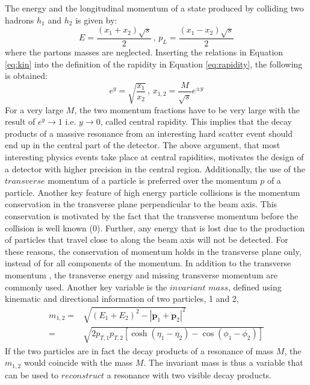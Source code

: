 The energy and the longitudinal momentum of a state produced by colliding two hadrons $h_{1}$ and $h_{2}$ is given by:
\begin{equation}
E=\frac{(x_{1}+x_{2})\sqrt{s}}{2}\, , \, p_{L}=\frac{(x_{1}-x_{2})\sqrt{s}}{2}
\label{eq:kin}
\end{equation}
where the partons masses are neglected. 
Inserting the relations in Equation \ref{eq:kin} into the definition of the rapidity in Equation \ref{eq:rapidity}, the following is obtained:
\begin{equation}
e^{y}=\sqrt{\frac{x_{1}}{x_{2}}}\, , \,x_{1,2}=\frac{M}{\sqrt{s}}e^{\pm y}
\end{equation}
For a very large $M$, the two momentum fractions have to be very large with the result of $e^{y}\rightarrow 1$ i.e. $y\rightarrow 0$, called central rapidity. 
This implies that the decay products of a massive resonance from an interesting hard scatter event should end up in the central part of the detector. 
\newpara
\noindent\justify
The above argument, that most interesting physics events take place at central rapidities, motivates the design of a detector with higher precision in the central region.
Additionally, the use of the $transverse$ momentum \pt of a particle is preferred over the momentum $p$ of a particle. 
Another key feature of high energy particle collisions is the momentum conservation in the transverse plane perpendicular to the beam axis.
This conservation is motivated by the fact that the transverse momentum before the collision is well known (0). 
Further, any energy that is lost due to the production of particles that travel close to along the beam axis will not be detected. 
For these reasons, the conservation of momentum holds in the transverse plane only, instead of for all components of the momentum. 
In addition to the transverse momentum \pt, the transverse energy \ET and missing transverse momentum \ptmiss are commonly used.
\newpara
\noindent\justify
Another key variable is the $invariant$ $mass$, defined using kinematic and directional information of two particles, 1 and 2,
\begin{align} 
m_{1,2}=&\sqrt{(E_{1}+E_{2})^{2}-|\mathbf{p}_{1}+\mathbf{p}_{2}|^{2}}\\
    =&\sqrt{2p_{T,1}p_{T,2}[\cosh(\eta_{1}-\eta_{2})-\cos(\phi_{1}-\phi_{2})]} 
\end{align} 
If the two particles  are in fact the decay products of a resonance of mass $M$, the $m_{1,2}$ would coincide with the mass $M$. 
The invariant mass is thus a variable that can be used to $reconstruct$ a resonance with two visible decay products. 
